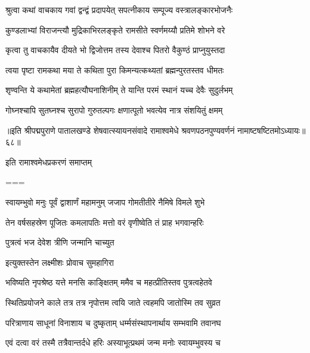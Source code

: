 \twolineshloka
{श्रुत्वा कथां वाचकाय गवां द्वन्द्वं प्रदापयेत्}
{सपत्नीकाय सम्पूज्य वस्त्रालङ्कारभोजनैः}%

\twolineshloka
{कुण्डलाभ्यां विराजन्त्यौ मुद्रिकाभिरलङ्कृते}
{रामसीते स्वर्णमय्यौ प्रतिमे शोभने वरे}%

\twolineshloka
{कृत्वा तु वाचकायैव दीयते भो द्विजोत्तम}
{तस्य देवाश्च पितरो वैकुण्ठं प्राप्नुयुस्तदा}%

\twolineshloka
{त्वया पृष्टा रामकथा मया ते कथिता पुरा}
{किमन्यत्कथ्यतां ब्रह्मन्पुरतस्तव धीमतः}%

\twolineshloka
{शृण्वन्ति ये कथामेतां ब्रह्महत्यौघनाशिनीम्}
{ते यान्ति परमं स्थानं यच्च देवैः सुदुर्लभम्}%

\twolineshloka
{गोघ्नश्चापि सुतघ्नश्च सुरापो गुरुतल्पगः}
{क्षणात्पूतो भवत्येव नात्र संशयितुं क्षमम्}%

॥इति श्रीपद्मपुराणे पातालखण्डे शेषवात्स्यायनसंवादे रामाश्वमेधे श्रवणपठनपुण्यवर्णनं नामाष्टषष्टितमोऽध्यायः॥६८॥

इति रामाश्वमेधप्रकरणं समाप्तम्

===



\twolineshloka
{स्वायम्भुवो मनुः पूर्वं द्वाशार्णं महामनुम्}
{जजाप गोमतीतीरे नैमिषे विमले शुभे}%

\twolineshloka
{तेन वर्षसहस्रेण पूजितः कमलापतिः}
{मत्तो वरं वृणीष्वेति तं प्राह भगवान्हरिः}%


\onelineshloka
{पुत्रत्वं भज देवेश त्रीणि जन्मानि चाच्युत}%


\onelineshloka
{इत्युक्तस्तेन लक्ष्मीशः प्रोवाच सुमहागिरा}%


\twolineshloka
{भविष्यति नृपश्रेष्ठ यत्ते मनसि काङ्क्षितम्}
{ममैव च महत्प्रीतिस्तव पुत्रत्वहेतवे}%

\twolineshloka
{स्थितिप्रयोजने काले तत्र तत्र नृपोत्तम}
{त्वयि जाते त्वहमपि जातोस्मि तव सुव्रत}%

\twolineshloka
{परित्राणाय साधूनां विनाशाय च दुष्कृताम्}
{धर्म्मसंस्थापनार्थाय सम्भवामि तवानघ}%


\twolineshloka
{एवं दत्वा वरं तस्मै तत्रैवान्तर्दधे हरिः}
{अस्याभूत्प्रथमं जन्म मनोः स्वायम्भुवस्य च}%

